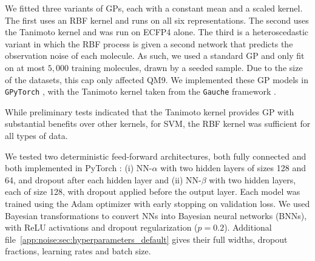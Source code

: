We fitted three variants of GPs, each with a constant mean and a scaled kernel. The first uses an RBF kernel and runs on all six representations. The second uses the Tanimoto kernel \citep{Ralaivola2005, moss2020} and was run on ECFP4 alone. The third is a heteroscedastic variant in which the RBF process is given a second network that predicts the observation noise of each molecule. As such, we used a standard GP and only fit on at most $5{,}000$ training molecules, drawn by a seeded sample. Due to the size of the datasets, this cap only affected QM9. We implemented these GP models in \texttt{GPyTorch} \citep{gpytorch}, with the Tanimoto kernel taken from the \texttt{Gauche} framework \citep{gauche}.

While preliminary tests indicated that the Tanimoto kernel provides GP with substantial benefits over other kernels, for SVM, the RBF kernel was sufficient for all types of data.

We tested two deterministic feed-forward architectures, both fully connected and both implemented in PyTorch \citep{pytorchGeometric}: (i) NN-$\alpha$ with two hidden layers of sizes 128 and 64, and dropout after each hidden layer and (ii) NN-$\beta$ with two hidden layers, each of size 128, with dropout applied before the output layer. Each model was trained using the Adam optimizer with early stopping on validation loss. We used Bayesian transformations to convert NNs into Bayesian neural networks (BNNs), with ReLU activations and dropout regularization ($p=0.2$). Additional file~\ref{app:noise:sec:hyperparameters_default} gives their full widths, dropout fractions, learning rates and batch size.

